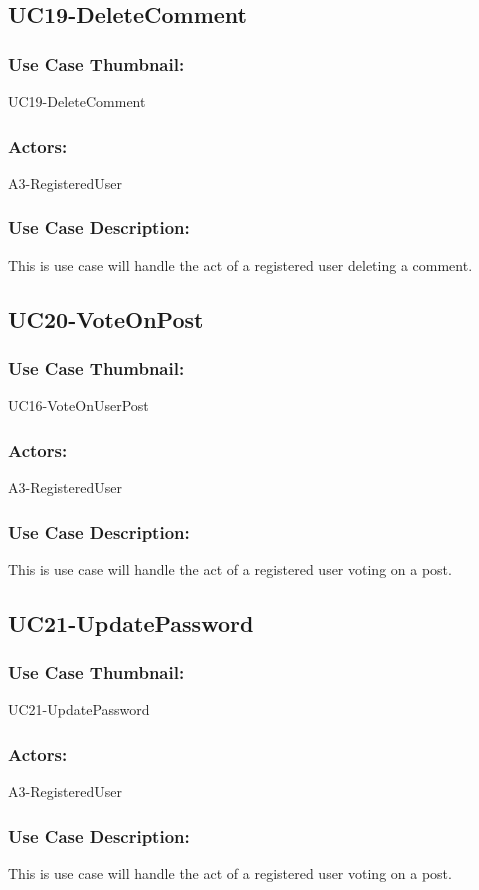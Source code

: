 \documentclass[11pt, openany]{report}
\begin{document}
\subsection{UC19-DeleteComment}
\label{sUC19}
\subsubsection*{Use Case Thumbnail:}
UC19-DeleteComment
\subsubsection*{Actors:}
A3-RegisteredUser
\subsubsection*{Use Case Description:}
This is use case will handle the act of a registered user deleting a comment.


\subsection{UC20-VoteOnPost}
\label{sUC20}
\subsubsection*{Use Case Thumbnail:}
UC16-VoteOnUserPost
\subsubsection*{Actors:}
A3-RegisteredUser
\subsubsection*{Use Case Description:}
This is use case will handle the act of a registered user voting on a post.

\subsection{UC21-UpdatePassword}
\label{sUC21}
\subsubsection*{Use Case Thumbnail:}
UC21-UpdatePassword
\subsubsection*{Actors:}
A3-RegisteredUser
\subsubsection*{Use Case Description:}
This is use case will handle the act of a registered user voting on a post.
\end{document}
